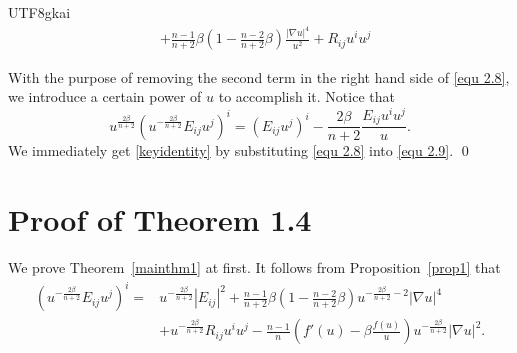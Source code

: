 \documentclass[reqno,12pt]{amsart}
\newcommand{\text}{\mbox}
\numberwithin{equation}{section}
\newtheorem{rmk}[thm]{Remark}
\newcommand{\thmref}[1]{Theorem~\ref{#1}}
\newcommand{\propref}[1]{Proposition~\ref{#1}}
\begin{document}
\begin{CJK}{UTF8}{gkai}
\begin{equation}
\begin{aligned}
    	&+\frac{n-1}{n+2}\beta(1-\frac{n-2}{n+2}\beta)\frac{|\nabla u|^{4}}{u^{2}}+R_{ij}u^{i}u^{j}
    	\end{aligned}
   \end{equation}

   With the purpose of removing the second term in the right hand side of \eqref{equ 2.8}, we introduce a certain power of $u$ to accomplish it. Notice that
    \begin{equation}\label{equ 2.9}
    	u^{\frac{2\beta}{n+2}}\left(u^{-\frac{2\beta}{n+2}}E_{ij}u^{j}\right)^{i}=\left(E_{ij}u^{j}\right)^{i}-\frac{2\beta}{n+2}\frac{E_{ij}u^{i}u^{j}}{u}.
    \end{equation}
   We immediately get \eqref{keyidentity} by substituting \eqref{equ 2.8} into \eqref{equ 2.9}. \qed 
   
  
   
\section{Proof of Theorem 1.4}
   We  prove \thmref{mainthm1} at first. It follows from \propref{prop1} that
  	\begin{equation}\label{identity}
  	\begin{aligned}
  		\left(u^{-\frac{2\beta}{n+2}}E_{ij}u^{j}\right)^{i}=&u^{-\frac{2\beta}{n+2}}|E_{ij}|^{2}+\frac{n-1}{n+2}\beta\left(1-\frac{n-2}{n+2}\beta\right)u^{-\frac{2\beta}{n+2}-2}|\nabla u|^{4}\\
  		&+u^{-\frac{2\beta}{n+2}}R_{ij}u^{i}u^{j}-\frac{n-1}{n}\left(f'(u)-\beta\frac{f(u)}{u}\right)u^{-\frac{2\beta}{n+2}}|\nabla u|^{2}.
  	\end{aligned}
  \end{equation}
  

\end{CJK}
\end{document}
